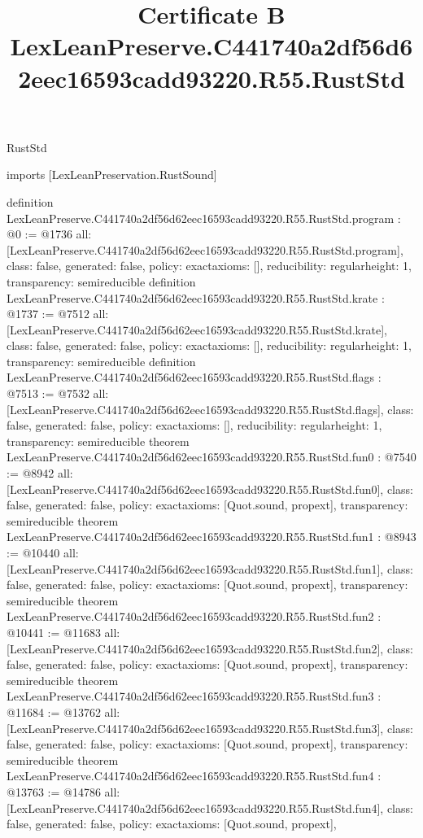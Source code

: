 \begin{lexlean}{RustStd}
\title{Certificate B LexLeanPreserve.C441740a2df56d62eec16593cadd93220.R55.RustStd}
\begin{coremodule}
imports [LexLeanPreservation.RustSound]

definition LexLeanPreserve.C441740a2df56d62eec16593cadd93220.R55.RustStd.program : @0 := @1736 {
  all: [LexLeanPreserve.C441740a2df56d62eec16593cadd93220.R55.RustStd.program],
  class: false,
  generated: false,
  policy: exact{axioms: []},
  reducibility: regular{height: 1},
  transparency: semireducible
}
definition LexLeanPreserve.C441740a2df56d62eec16593cadd93220.R55.RustStd.krate : @1737 := @7512 {
  all: [LexLeanPreserve.C441740a2df56d62eec16593cadd93220.R55.RustStd.krate],
  class: false,
  generated: false,
  policy: exact{axioms: []},
  reducibility: regular{height: 1},
  transparency: semireducible
}
definition LexLeanPreserve.C441740a2df56d62eec16593cadd93220.R55.RustStd.flags : @7513 := @7532 {
  all: [LexLeanPreserve.C441740a2df56d62eec16593cadd93220.R55.RustStd.flags],
  class: false,
  generated: false,
  policy: exact{axioms: []},
  reducibility: regular{height: 1},
  transparency: semireducible
}
theorem LexLeanPreserve.C441740a2df56d62eec16593cadd93220.R55.RustStd.fun0 : @7540 := @8942 {
  all: [LexLeanPreserve.C441740a2df56d62eec16593cadd93220.R55.RustStd.fun0],
  class: false,
  generated: false,
  policy: exact{axioms: [Quot.sound, propext]},
  transparency: semireducible
}
theorem LexLeanPreserve.C441740a2df56d62eec16593cadd93220.R55.RustStd.fun1 : @8943 := @10440 {
  all: [LexLeanPreserve.C441740a2df56d62eec16593cadd93220.R55.RustStd.fun1],
  class: false,
  generated: false,
  policy: exact{axioms: [Quot.sound, propext]},
  transparency: semireducible
}
theorem LexLeanPreserve.C441740a2df56d62eec16593cadd93220.R55.RustStd.fun2 : @10441 := @11683 {
  all: [LexLeanPreserve.C441740a2df56d62eec16593cadd93220.R55.RustStd.fun2],
  class: false,
  generated: false,
  policy: exact{axioms: [Quot.sound, propext]},
  transparency: semireducible
}
theorem LexLeanPreserve.C441740a2df56d62eec16593cadd93220.R55.RustStd.fun3 : @11684 := @13762 {
  all: [LexLeanPreserve.C441740a2df56d62eec16593cadd93220.R55.RustStd.fun3],
  class: false,
  generated: false,
  policy: exact{axioms: [Quot.sound, propext]},
  transparency: semireducible
}
theorem LexLeanPreserve.C441740a2df56d62eec16593cadd93220.R55.RustStd.fun4 : @13763 := @14786 {
  all: [LexLeanPreserve.C441740a2df56d62eec16593cadd93220.R55.RustStd.fun4],
  class: false,
  generated: false,
  policy: exact{axioms: [Quot.sound, propext]},
}
\end{coremodule}
\end{lexlean}
